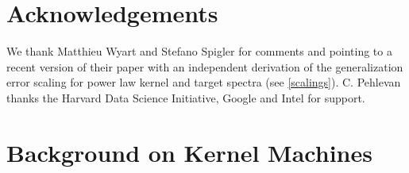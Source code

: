 \documentclass{article}
\begin{document}



\section*{Acknowledgements} We thank Matthieu Wyart and Stefano Spigler for comments and pointing to a recent version of their paper \cite{spigler2019asymptotic} with an independent derivation of the generalization error scaling for power law kernel and target spectra (see \eqref{scalings}). C. Pehlevan thanks the Harvard Data Science Initiative, Google and Intel for support.







\newpage



\setcounter{section}{0}
\setcounter{equation}{0}
\setcounter{figure}{0}
\renewcommand{\theequation}{SI.\arabic{equation}}
\renewcommand{\thefigure}{SI.\arabic{figure}}

\section{Background on Kernel Machines}\label{SIKernelMachines}
\end{document}
